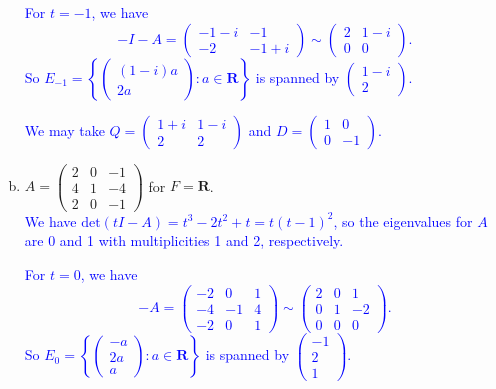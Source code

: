 \documentclass[a4paper,11pt]{article}
\newcommand{\R}{\mathbf{R}}
\newcommand{\ddet}{\text{det}}
\newcommand{\blue}[1]{\textcolor{blue}{#1}}
\begin{document}
\begin{enumerate}[(a)]
\blue{For $t=-1$, we have
  \[
    -I-A =
    \left(
      \begin{array}{rr}
        -1-i&-1\\-2&-1+i
      \end{array}
    \right)
    \sim
    \left(
      \begin{array}{rr}
        2&1-i\\0&0
      \end{array}
    \right).
  \]
  So $E_{-1}=\left\{ \left( \begin{smallmatrix}(1-i)a\\2a\end{smallmatrix}
    \right) : a \in \R \right\}$ is spanned by
  $\left( \begin{smallmatrix}1-i\\2\end{smallmatrix} \right)$.}

\blue{We may take $Q=\left( \begin{smallmatrix}1+i&1-i\\2&2\end{smallmatrix}
  \right)$ and $D=\left( \begin{smallmatrix}1&0\\0&-1\end{smallmatrix} \right)$.
\\}
  
\item $A=\left( \begin{smallmatrix}2&0&-1\\4&1&-4\\2&0&-1\end{smallmatrix}
  \right)$ for $F=\R$. \\

  \blue{We have $\ddet(tI-A)=t^3-2t^2+t=t(t-1)^2$, so the eigenvalues for $A$
    are 0 and 1 with multiplicities 1 and 2, respectively.}

  \blue{For $t=0$, we have
    \[
      -A =
      \left(
        \begin{array}{rrr}
          -2&0&1\\
          -4&-1&4\\
          -2&0&1
        \end{array}
      \right)
      \sim
      \left(
        \begin{array}{rrr}
          2&0&1\\
          0&1&-2\\
          0&0&0
        \end{array}
      \right).
    \]
    So $E_0=\left\{ \left( \begin{smallmatrix}-a\\2a\\a\end{smallmatrix} \right)
    : a \in \R\right\}$ is spanned by
  $\left( \begin{smallmatrix}-1\\2\\1\end{smallmatrix} \right)$.}


\end{enumerate}
\end{document}
